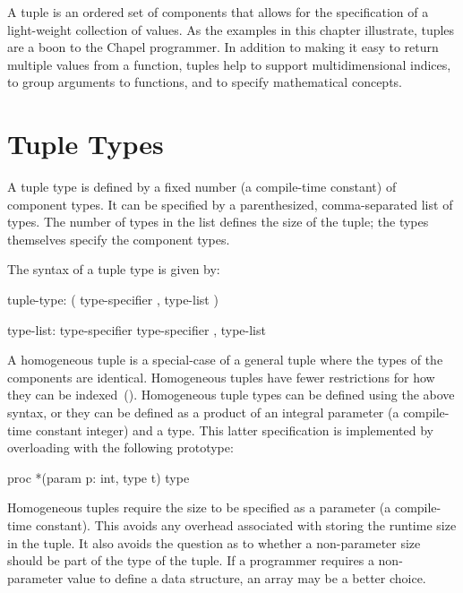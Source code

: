 \label{Tuples}

A tuple is an ordered set of components that allows for the
specification of a light-weight collection of values.  As the examples
in this chapter illustrate, tuples are a boon to the Chapel
programmer.  In addition to making it easy to return multiple values
from a function, tuples help to support multidimensional indices, to
group arguments to functions, and to specify mathematical concepts.

\section{Tuple Types}
\label{Tuple_Types}

A tuple type is defined by a fixed number (a compile-time constant) of
component types.  It can be specified by a parenthesized,
comma-separated list of types.  The number of types in the list
defines the size of the tuple; the types themselves specify the
component types.

The syntax of a tuple type is given by:
\begin{syntax}
tuple-type:
  ( type-specifier , type-list )

type-list:
  type-specifier
  type-specifier , type-list
\end{syntax}

A homogeneous tuple is a special-case of a general tuple where the
types of the components are identical.  Homogeneous tuples have fewer
restrictions for how they can be indexed~().
Homogeneous tuple types can be defined using the above syntax, or they
can be defined as a product of an integral parameter (a compile-time
constant integer) and a type.  This latter specification is
implemented by overloading \chpl{*} with the following prototype:
\begin{chapel}
proc *(param p: int, type t) type
\end{chapel}

\begin{rationale}
Homogeneous tuples require the size to be specified as a parameter
(a compile-time constant).  This avoids any overhead associated with
storing the runtime size in the tuple.  It also avoids the question as
to whether a non-parameter size should be part of the type of the
tuple.  If a programmer requires a non-parameter value to define a
data structure, an array may be a better choice.
\end{rationale}

